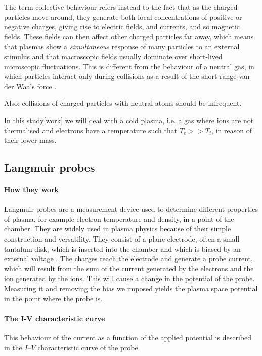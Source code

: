The term collective behaviour refers instead to the fact that as the charged particles move around, they generate both local concentrations of positive or negative charges, giving rise to electric fields, and currents, and so magnetic fields\cite{chen_introduction_2006}.
These fields can then affect other charged particles far away, which means that plasmas show a \emph{simultaneous} response of many particles to an external stimulus and that macroscopic fields usually dominate over short-lived microscopic fluctuations.
This is  different from the behaviour of a neutral gas, in which particles interact only during collisions as a result of the short-range van der Waals force \cite{piel_plasma_2017}.

Also: collisions of charged particles with neutral atoms should be infrequent.

In this study[work] we will deal with a cold plasma, i.e. a gas where ions are not thermalised and electrons have a temperature such that $T_e >> T_i$, in reason of their lower mass\cite{bagnato_notice_2019}.

\subsection{Langmuir probes}
\paragraph{How they work}
Langmuir probes are a measurement device used to determine different properties of plasma, for example electron temperature and density, in a point of the chamber.
They are widely used in plasma physics because of their simple construction and versatility.
They consist of a plane electrode, often a small tantalum disk, which is inserted into the chamber and which is biased by an external voltage \cite{piel_plasma_2017}.
The charges reach the electrode and generate a probe current, which will result from the sum of the current generated by the electrons and the ion generated by the ions.
This will cause a change in the potential of the probe. Measuring it and removing the bias we imposed yields the plasma space potential in the point where the probe is.

\paragraph{The I-V characteristic curve}
This behaviour of the current as a function of the applied potential is described in the $I$--$V$ characteristic curve of the probe.

